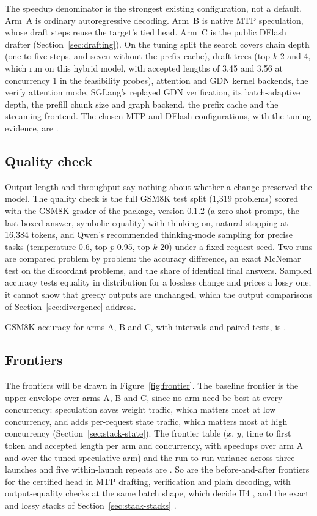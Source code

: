The speedup denominator is the strongest existing configuration, not a default. Arm~A is ordinary autoregressive decoding. Arm~B is native MTP speculation, whose draft steps reuse the target's tied head. Arm~C is the public DFlash drafter (Section~\ref{sec:drafting}). On the tuning split the search covers chain depth (one to five steps, and seven without the prefix cache), draft trees (top-$k$ 2 and 4, which run on this hybrid model, with accepted lengths of 3.45 and 3.56 at concurrency 1 in the feasibility probes), attention and GDN kernel backends, the verify attention mode, SGLang's replayed GDN verification, its batch-adaptive depth, the prefill chunk size and graph backend, the prefix cache and the streaming frontend. The chosen MTP and DFlash configurations, with the tuning evidence, are .

\subsection{Quality check}\label{sec:serving-quality}
Output length and throughput say nothing about whether a change preserved the model. The quality check is the full GSM8K test split (1,319 problems) scored with the GSM8K grader of the  package, version 0.1.2 (a zero-shot prompt, the last boxed answer, symbolic equality) with thinking on, natural stopping at 16,384 tokens, and Qwen's recommended thinking-mode sampling for precise tasks (temperature 0.6, top-$p$ 0.95, top-$k$ 20) under a fixed request seed.
Two runs are compared problem by problem: the accuracy difference, an exact McNemar test on the discordant problems, and the share of identical final answers. Sampled accuracy tests equality in distribution for a lossless change and prices a lossy one; it cannot show that greedy outputs are unchanged, which the output comparisons of Section~\ref{sec:divergence} address.

GSM8K accuracy for arms A, B and C, with intervals and paired tests, is .

\subsection{Frontiers}\label{sec:serving-frontiers}
The frontiers will be drawn in Figure~\ref{fig:frontier}. The baseline frontier is the upper envelope over arms A, B and C, since no arm need be best at every concurrency: speculation saves weight traffic, which matters most at low concurrency, and adds per-request state traffic, which matters most at high concurrency (Section~\ref{sec:stack-state}). The frontier table ($x$, $y$, time to first token and accepted length per arm and concurrency, with speedups over arm A and over the tuned speculative arm) and the run-to-run variance across three launches and five within-launch repeats are . So are the before-and-after frontiers for the certified head in MTP drafting, verification and plain decoding, with output-equality checks at the same batch shape, which decide H4 , and the exact and lossy stacks of Section~\ref{sec:stack-stacks} .

